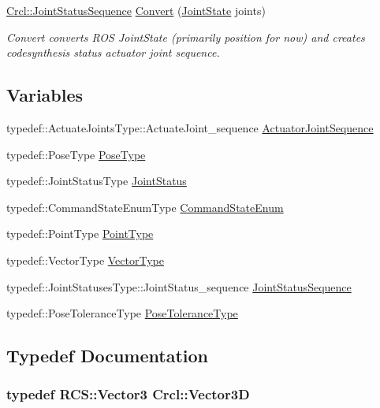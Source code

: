\begin{DoxyCompactItemize}
\hyperlink{namespaceCrcl_a8e2d423195eeffb85b45b63f595f2825}{Crcl\-::\-Joint\-Status\-Sequence} \hyperlink{namespaceCrcl_a1f43fba61abba477ee664c4b5c6dd65b}{Convert} (\hyperlink{RCS_8h_aa4adb93a26caa4dacba9c9614e283245}{Joint\-State} joints)
\begin{DoxyCompactList}\small\item\em Convert converts R\-O\-S Joint\-State (primarily position for now) and creates codesynthesis status actuator joint sequence. \end{DoxyCompactList}\end{DoxyCompactItemize}
\subsection*{Variables}
\begin{DoxyCompactItemize}
\item 
typedef\-::\-Actuate\-Joints\-Type\-::\-Actuate\-Joint\-\_\-sequence \hyperlink{namespaceCrcl_af084766e8e2d38a135cc67ef54d9904d}{Actuator\-Joint\-Sequence}
\item 
typedef\-::\-Pose\-Type \hyperlink{namespaceCrcl_acc6c82b52280f4d0e74b82a92400956e}{Pose\-Type}
\item 
typedef\-::\-Joint\-Status\-Type \hyperlink{namespaceCrcl_a687707df3e92b0a1821bec2a0194039f}{Joint\-Status}
\item 
typedef\-::\-Command\-State\-Enum\-Type \hyperlink{namespaceCrcl_a5b3aa14f2f4ed63cc67ecba8eaab5c93}{Command\-State\-Enum}
\item 
typedef\-::\-Point\-Type \hyperlink{namespaceCrcl_a04f09d617642257f5938e52cee2feeef}{Point\-Type}
\item 
typedef\-::\-Vector\-Type \hyperlink{namespaceCrcl_ae868d4ece511d1485ed5d9118395aef8}{Vector\-Type}
\item 
typedef\-::\-Joint\-Statuses\-Type\-::\-Joint\-Status\-\_\-sequence \hyperlink{namespaceCrcl_a8e2d423195eeffb85b45b63f595f2825}{Joint\-Status\-Sequence}
\item 
typedef\-::\-Pose\-Tolerance\-Type \hyperlink{namespaceCrcl_ac805071e16341b82d4fa4e12b7f3ac6f}{Pose\-Tolerance\-Type}
\end{DoxyCompactItemize}


\subsection{Typedef Documentation}
\hypertarget{namespaceCrcl_a8d272fb6207c4f4195f4309c71d00a9c}{
\subsubsection[{Vector3\-D}]{\setlength{\rightskip}{0pt plus 5cm}typedef {\bf R\-C\-S\-::\-Vector3} {\bf Crcl\-::\-Vector3\-D}}}\label{namespaceCrcl_a8d272fb6207c4f4195f4309c71d00a9c}


